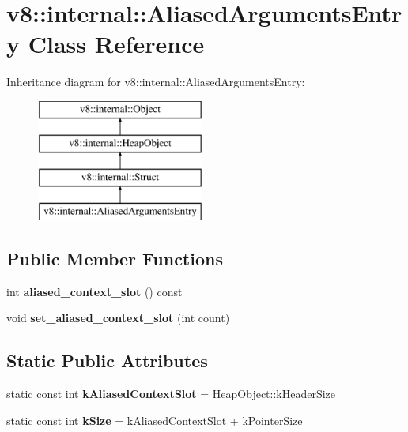\hypertarget{classv8_1_1internal_1_1_aliased_arguments_entry}{}\section{v8\+:\+:internal\+:\+:Aliased\+Arguments\+Entry Class Reference}
\label{classv8_1_1internal_1_1_aliased_arguments_entry}
Inheritance diagram for v8\+:\+:internal\+:\+:Aliased\+Arguments\+Entry\+:\begin{figure}[H]
\begin{center}
\leavevmode
\includegraphics[height=4.000000cm]{classv8_1_1internal_1_1_aliased_arguments_entry}
\end{center}
\end{figure}
\subsection*{Public Member Functions}
\begin{DoxyCompactItemize}
\item 
int {\bfseries aliased\+\_\+context\+\_\+slot} () const \hypertarget{classv8_1_1internal_1_1_aliased_arguments_entry_a5362f3a14badae7882341093623de3fb}{}\label{classv8_1_1internal_1_1_aliased_arguments_entry_a5362f3a14badae7882341093623de3fb}

\item 
void {\bfseries set\+\_\+aliased\+\_\+context\+\_\+slot} (int count)\hypertarget{classv8_1_1internal_1_1_aliased_arguments_entry_ad2f671a7089a9e775abd7e1c039aeee7}{}\label{classv8_1_1internal_1_1_aliased_arguments_entry_ad2f671a7089a9e775abd7e1c039aeee7}

\end{DoxyCompactItemize}
\subsection*{Static Public Attributes}
\begin{DoxyCompactItemize}
\item 
static const int {\bfseries k\+Aliased\+Context\+Slot} = Heap\+Object\+::k\+Header\+Size\hypertarget{classv8_1_1internal_1_1_aliased_arguments_entry_a176665f23529fbe29ad19856967a7ee7}{}\label{classv8_1_1internal_1_1_aliased_arguments_entry_a176665f23529fbe29ad19856967a7ee7}

\item 
static const int {\bfseries k\+Size} = k\+Aliased\+Context\+Slot + k\+Pointer\+Size\hypertarget{classv8_1_1internal_1_1_aliased_arguments_entry_ad9980e02f526db5b9f4e095848a2d325}{}\label{classv8_1_1internal_1_1_aliased_arguments_entry_ad9980e02f526db5b9f4e095848a2d325}

\end{DoxyCompactItemize}
